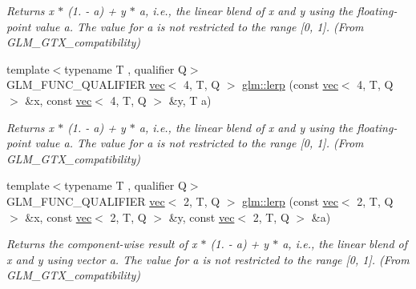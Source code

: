 \begin{DoxyCompactItemize}
\begin{DoxyCompactList}\small\item\em Returns x $\ast$ (1. -\/ a) + y $\ast$ a, i.\+e., the linear blend of x and y using the floating-\/point value a. The value for a is not restricted to the range \mbox{[}0, 1\mbox{]}. (From G\+L\+M\+\_\+\+G\+T\+X\+\_\+compatibility) \end{DoxyCompactList}\item 
\mbox{\label{group__gtx__compatibility_ga89ac8e000199292ec7875519d27e214b}} 
{\footnotesize template$<$typename T , qualifier Q$>$ }\\G\+L\+M\+\_\+\+F\+U\+N\+C\+\_\+\+Q\+U\+A\+L\+I\+F\+I\+ER \hyperlink{structglm_1_1vec}{vec}$<$ 4, T, Q $>$ \hyperlink{group__gtx__compatibility_ga89ac8e000199292ec7875519d27e214b}{glm\+::lerp} (const \hyperlink{structglm_1_1vec}{vec}$<$ 4, T, Q $>$ \&x, const \hyperlink{structglm_1_1vec}{vec}$<$ 4, T, Q $>$ \&y, T a)
\begin{DoxyCompactList}\small\item\em Returns x $\ast$ (1. -\/ a) + y $\ast$ a, i.\+e., the linear blend of x and y using the floating-\/point value a. The value for a is not restricted to the range \mbox{[}0, 1\mbox{]}. (From G\+L\+M\+\_\+\+G\+T\+X\+\_\+compatibility) \end{DoxyCompactList}\item 
\mbox{\label{group__gtx__compatibility_gaf68de5baf72d16135368b8ef4f841604}} 
{\footnotesize template$<$typename T , qualifier Q$>$ }\\G\+L\+M\+\_\+\+F\+U\+N\+C\+\_\+\+Q\+U\+A\+L\+I\+F\+I\+ER \hyperlink{structglm_1_1vec}{vec}$<$ 2, T, Q $>$ \hyperlink{group__gtx__compatibility_gaf68de5baf72d16135368b8ef4f841604}{glm\+::lerp} (const \hyperlink{structglm_1_1vec}{vec}$<$ 2, T, Q $>$ \&x, const \hyperlink{structglm_1_1vec}{vec}$<$ 2, T, Q $>$ \&y, const \hyperlink{structglm_1_1vec}{vec}$<$ 2, T, Q $>$ \&a)
\begin{DoxyCompactList}\small\item\em Returns the component-\/wise result of x $\ast$ (1. -\/ a) + y $\ast$ a, i.\+e., the linear blend of x and y using vector a. The value for a is not restricted to the range \mbox{[}0, 1\mbox{]}. (From G\+L\+M\+\_\+\+G\+T\+X\+\_\+compatibility) \end{DoxyCompactList}\item 
\mbox{\label{group__gtx__compatibility_ga4ae1a616c8540a2649eab8e0cd051bb3}} 

\end{DoxyCompactItemize}
